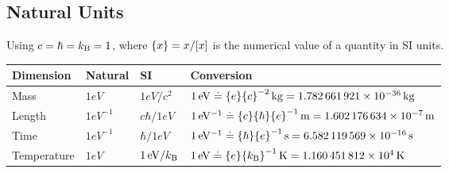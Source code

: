 	\subsection{Natural Units}
		Using $c=\hbar=k_{\text{B}}=1$, where $\qty{x}=x/\qty[x]$ is the numerical value of a quantity in SI units.
		\begin{center}
			\begin{tabular}{| L{.15\textwidth} L{.1\textwidth} L{.1\textwidth} L{.5\textwidth} |}
				\hline
				Dimension & Natural & SI & Conversion \\ \hline \hline
				Mass & $1\unit{eV}$ & $1\unit{eV} / c^2$ & $1\,\mathrm{eV}\doteq \qty{e}\qty{c}^{-2}\,\mathrm{kg}=1.782\,661\,921\times 10^{-36}\,\mathrm{kg}$ \\ \hline
				Length & $1\unit{eV^{-1}}$ & $c \hbar / 1 \unit{eV}$ & $1\,\mathrm{eV^{-1}}\doteq \qty{c}\qty{\hbar}\qty{e}^{-1}\,\mathrm{m}=1.602\,176\,634\times 10^{-7}\,\mathrm{m}$ \\ \hline
				Time & $1\unit{eV^{-1}}$ & $\hbar / 1 \unit{eV}$ & $1\,\mathrm{eV^{-1}}\doteq \qty{\hbar}\qty{e}^{-1}\,\mathrm{s}=6.582\,119\,569\times 10^{-16}\,\mathrm{s}$ \\ \hline
				Temperature & $1\unit{eV}$ & $1\,\mathrm{eV} / k_{\text{B}}$ & $1\,\mathrm{eV}\doteq \qty{e}\qty{k_{\text{B}}}^{-1}\,\mathrm{K}=1.160\,451\,812\times 10^{4}\,\mathrm{K}$ \\ \hline
			\end{tabular}
		\end{center}